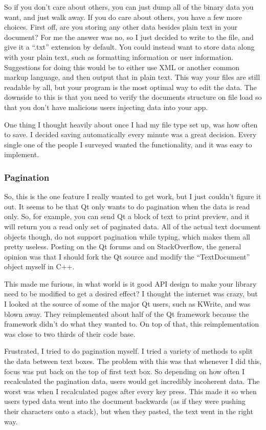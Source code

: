 \documentclass[10pt]{article}
\begin{document}
So if you don't care about others, you can just dump all of the binary data you want, and just walk away. If you do care about others, you have a few more choices. First off, are you storing any other data besides plain text in your document? For me the answer was no, so I just decided to write to the file, and give it a ``.txt'' extension by default. You could instead want to store data along with your plain text, such as formatting information or user information. Suggestions for doing this would be to either use XML or another common markup language, and then output that in plain text. This way your files are still readable by all, but your program is the most optimal way to edit the data. The downside to this is that you need to verify the documents structure on file load so that you don't have malicious users injecting data into your app.

One thing I thought heavily about once I had my file type set up, was how often to save. I decided saving automatically every minute was a great decision. Every single one of the people I surveyed wanted the functionality, and it was easy to implement.

\subsubsection{Pagination}

So, this is the one feature I really wanted to get work, but I just couldn't figure it out. It seems to be that Qt only wants to do pagination when the data is read only. So, for example, you can send Qt a block of text to print preview, and it will return you a read only set of paginated data. All of the actual text document objects though, do not support pagination while typing, which makes them all pretty useless. Posting on the Qt forums and on StackOverflow, the general opinion was that I should fork the Qt source and modify the ``TextDocument'' object myself in C++.

This made me furious, in what world is it good API design to make your library need to be modified to get a desired effect? I thought the internet was crazy, but I looked at the source of some of the major Qt users, such as KWrite, and was blown away. They reimplemented about half of the Qt framework because the framework didn't do what they wanted to. On top of that, this reimplementation was close to two thirds of their code base.

Frustrated, I tried to do pagination myself. I tried a variety of methods to split the data between text boxes. The problem with this was that whenever I did this, focus was put back on the top of first text box. So depending on how often I recalculated the pagination data, users would get incredibly incoherent data. The worst was when I recalculated pages after every key press. This made it so when users typed data went into the document backwards (as if they were pushing their characters onto a stack), but when they pasted, the text went in the right way.
\end{document}
